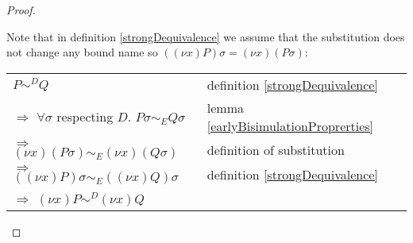 \begin{lemma}
\begin{proof}
\begin{description}
	Note that in definition \ref{strongDequivalence} we assume that the substitution does not change any bound name so $((\nu x) P)\sigma=(\nu x)(P\sigma)$:
	\begin{center}
	  \begin{tabular}{ll}
	      $P \sim^{D} Q$
	    &
	      definition \ref{strongDequivalence}
	  \\
	      $\Rightarrow$ $\forall \sigma$ respecting $D.$ $P\sigma \sim_{E} Q\sigma$
	    &
	      lemma \ref{earlyBisimulationProprerties}	      
	  \\
	      $\Rightarrow$ $(\nu x)(P\sigma) \sim_{E} (\nu x)(Q\sigma)$
	    &
	      definition of substitution 
	  \\
	      $\Rightarrow$ $((\nu x)P)\sigma \sim_{E} ((\nu x)Q)\sigma$
	    &
	      definition \ref{strongDequivalence}
	  \\
	      $\Rightarrow$ $(\nu x)P \sim^{D} (\nu x)Q$
	    &
	  \end{tabular}
	\end{center}		
    \end{description}
  \end{proof}
\end{lemma}



